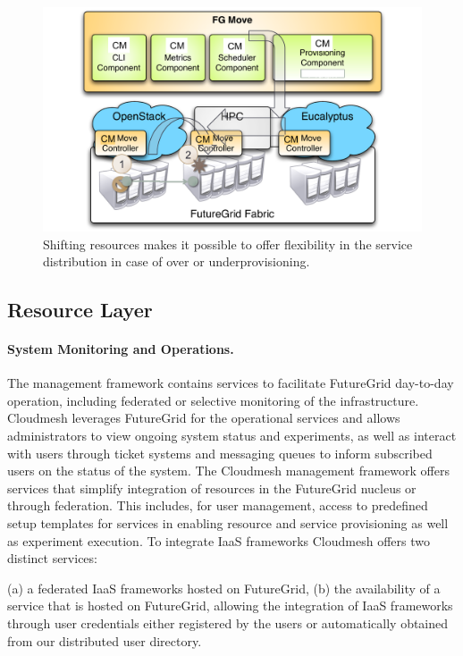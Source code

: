 \documentclass{tex/sig-alternate-2013}
\newcommand{\todo}[1]{{\color{red}{#1}}}
\newcommand{\READ}{\todo{READ}}
\begin{document}
\begin{figure}[htb]
  \centering
    \includegraphics[width=1.0\columnwidth]{images/shift2.pdf}
  \caption{Shifting resources makes it possible to offer flexibility
    in the service distribution in case of over or underprovisioning.}\label{F:shift}
\end{figure}

\subsection{Resource Layer}



\paragraph{System Monitoring and Operations. \READ}


The management framework contains services to facilitate FutureGrid day-to-day operation, including federated or selective monitoring of the infrastructure. Cloudmesh leverages FutureGrid for the operational services and allows administrators to view ongoing system status and experiments, as well as interact with users through ticket systems and messaging queues to inform subscribed users on the status of the system.
The Cloudmesh management framework offers services that simplify integration of resources in the FutureGrid nucleus or through federation. This includes, for user management, access to predefined setup templates for services in enabling resource and service provisioning as well as experiment execution. To integrate IaaS frameworks Cloudmesh offers two distinct services:


(a) a federated IaaS frameworks hosted on FutureGrid,
(b) the availability of a service that is hosted on FutureGrid, allowing the integration of IaaS frameworks through user credentials either registered by the users or automatically obtained from our distributed user directory.
\end{document}
